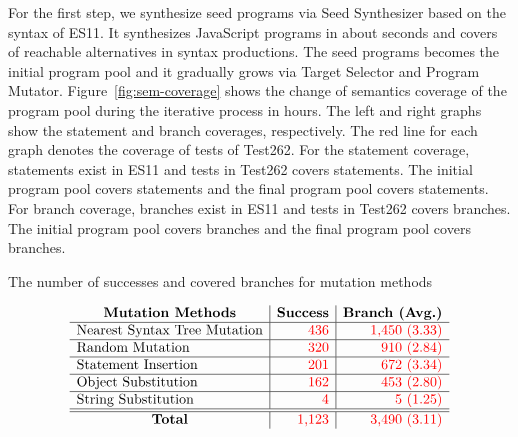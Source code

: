 For the first step, we synthesize seed programs via \textsf{Seed Synthesizer}
based on the syntax of ES11.  It synthesizes  JavaScript programs
in about  seconds and covers  of reachable
alternatives in syntax productions.  The seed programs becomes the initial
program pool and it gradually grows via \textsf{Target Selector} and
\textsf{Program Mutator}.  Figure~\ref{fig:sem-coverage} shows the change of
semantics coverage of the program pool during the iterative process in
 hours.  The left and right graphs show the statement and branch
coverages, respectively.  The red line for each graph denotes the coverage of
tests of Test262.  For the statement coverage,  statements exist
in ES11 and tests in Test262 covers  statements.  The
initial program pool covers  statements and the final
program pool covers  statements.  For branch coverage,
 branches exist in ES11 and tests in Test262 covers  branches.  The initial program pool covers 
branches and the final program pool covers  branches.

\begin{table}
  \caption{The number of successes and covered branches for mutation methods}
  \label{table:mutation-method}
  \vspace*{-1em}
  \small
  \[
    \begin{array}{l|r|r}
      \telembf{c|}{Mutation Methods}      & \telembf{c|}{Success}& \telembf{c}{Branch (Avg.)}\\\hline
      \text{Nearest Syntax Tree Mutation} & \rtext{436}       & \rtext{1,450 (3.33)}\\\hline
      \text{Random Mutation}              & \rtext{320}       & \rtext{910   (2.84)}\\\hline
      \text{Statement Insertion}          & \rtext{201}       & \rtext{672   (3.34)}\\\hline
      \text{Object Substitution}          & \rtext{162}       & \rtext{453   (2.80)}\\\hline
      \text{String Substitution}          & \rtext{4}         & \rtext{5     (1.25)}\\\hline
      \hline
      \telembf{c|}{Total}                 & \rtext{1,123}     & \rtext{3,490 (3.11)}\\
    \end{array}
  \]
  \vspace*{-1.5em}
\end{table}


